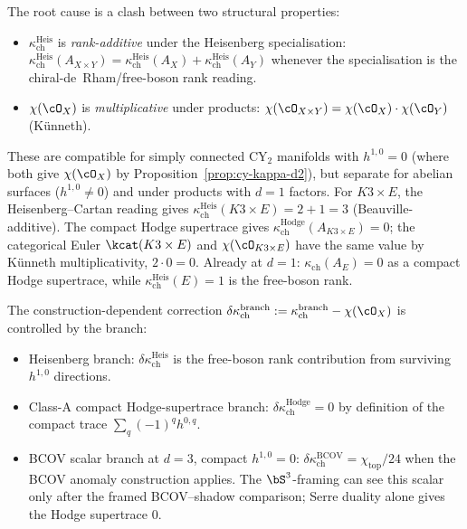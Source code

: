 \begin{remark}
\label{rem:cy-kappa-evidence}
The root cause is a clash between two structural properties:
\begin{itemize}
 \item $\kappa_{\mathrm{ch}}^{\mathrm{Heis}}$ is \emph{rank-additive} under the Heisenberg specialisation: $\kappa_{\mathrm{ch}}^{\mathrm{Heis}}(A_{X \times Y}) = \kappa_{\mathrm{ch}}^{\mathrm{Heis}}(A_X) + \kappa_{\mathrm{ch}}^{\mathrm{Heis}}(A_Y)$ whenever the specialisation is the chiral-de~Rham/free-boson rank reading.
 \item $\chi(\cO_X)$ is \emph{multiplicative} under products: $\chi(\cO_{X \times Y}) = \chi(\cO_X) \cdot \chi(\cO_Y)$ (K\"unneth).
\end{itemize}
These are compatible for simply connected CY$_2$ manifolds with
$h^{1,0} = 0$ (where both give $\chi(\cO_X)$ by
Proposition~\textup{\ref{prop:cy-kappa-d2}}), but separate for abelian
surfaces ($h^{1,0} \neq 0$) and under products with $d = 1$ factors. For
$K3 \times E$, the Heisenberg--Cartan reading gives
$\kappa_{\mathrm{ch}}^{\mathrm{Heis}}(K3 \times E) = 2 + 1 = 3$
(Beauville-additive). The compact Hodge supertrace gives
$\kappa_{\mathrm{ch}}^{\mathrm{Hodge}}(A_{K3 \times E})=0$; the categorical Euler
$\kcat(K3 \times E)$ and $\chi(\cO_{K3 \times E})$ have the same value
by K\"unneth multiplicativity, $2 \cdot 0 = 0$. Already at $d = 1$:
$\kappa_{\mathrm{ch}}(A_E)=0$ as a compact Hodge supertrace, while
$\kappa_{\mathrm{ch}}^{\mathrm{Heis}}(E) = 1$ is the free-boson rank.

The construction-dependent correction $\delta\kappa_{\mathrm{ch}}^{\mathrm{branch}} := \kappa_{\mathrm{ch}}^{\mathrm{branch}} - \chi(\cO_X)$ is controlled by the branch:
\begin{itemize}
 \item Heisenberg branch: $\delta\kappa_{\mathrm{ch}}^{\mathrm{Heis}}$ is the free-boson rank contribution from surviving $h^{1,0}$ directions.
 \item Class-A compact Hodge-supertrace branch: $\delta\kappa_{\mathrm{ch}}^{\mathrm{Hodge}} = 0$ by definition of the compact trace $\sum_q(-1)^q h^{0,q}$.
 \item BCOV scalar branch at $d = 3$, compact $h^{1,0} = 0$: $\delta\kappa_{\mathrm{ch}}^{\mathrm{BCOV}} = \chi_{\mathrm{top}}/24$ when the BCOV anomaly construction applies. The $\bS^3$-framing can see this scalar only after the framed BCOV--shadow comparison; Serre duality alone gives the Hodge supertrace $0$.
\end{itemize}
\end{remark}


